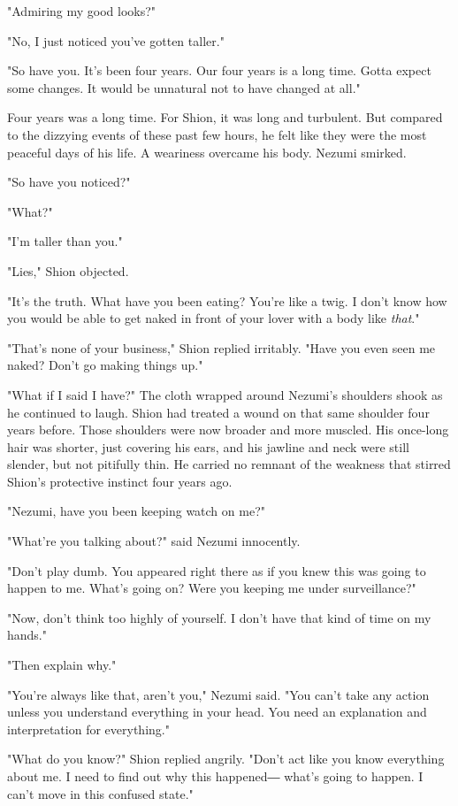 "Admiring my good looks?"

"No, I just noticed you've gotten taller."

"So have you. It's been four years. Our four years is a long time. Gotta
expect some changes. It would be unnatural not to have changed at all."

Four years was a long time. For Shion, it was long and turbulent. But
compared to the dizzying events of these past few hours, he felt like
they were the most peaceful days of his life. A weariness overcame his
body. Nezumi smirked.

"So have you noticed?"

"What?"

"I'm taller than you."

"Lies," Shion objected.

"It's the truth. What have you been eating? You're like a twig. I don't
know how you would be able to get naked in front of your lover with a
body like \emph{that}."

"That's none of your business," Shion replied irritably. "Have you even
seen me naked? Don't go making things up."

"What if I said I have?" The cloth wrapped around Nezumi's shoulders
shook as he continued to laugh. Shion had treated a wound on that same
shoulder four years before. Those shoulders were now broader and more
muscled. His once-long hair was shorter, just covering his ears, and his
jawline and neck were still slender, but not pitifully thin. He carried
no remnant of the weakness that stirred Shion's protective instinct four
years ago.

"Nezumi, have you been keeping watch on me?"

"What're you talking about?" said Nezumi innocently.

"Don't play dumb. You appeared right there as if you knew this was going
to happen to me. What's going on? Were you keeping me under
surveillance?"

"Now, don't think too highly of yourself. I don't have that kind of time
on my hands."

"Then explain why."

"You're always like that, aren't you," Nezumi said. "You can't take any
action unless you understand everything in your head. You need an
explanation and interpretation for everything."

"What do you know?" Shion replied angrily. "Don't act like you know
everything about me. I need to find out why this happened― what's going
to happen. I can't move in this confused state."

